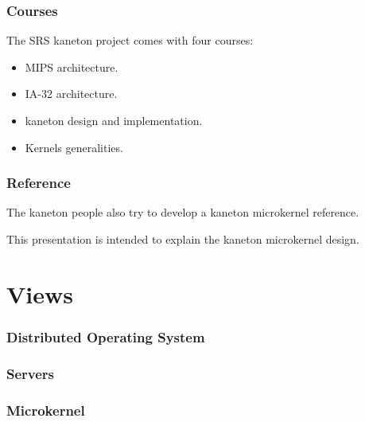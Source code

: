 
\begin{frame}
  \frametitle{Courses}

  The SRS kaneton project comes with four courses:

  \begin{itemize}[<+->]
    \item
      MIPS architecture.
    \item
      IA-32 architecture.
    \item
      kaneton design and implementation.
    \item
      Kernels generalities.
  \end{itemize}
\end{frame}


\begin{frame}
  \frametitle{Reference}

  The kaneton people also try to develop a kaneton microkernel reference.

  \nl

  This presentation is intended to explain the kaneton microkernel
  design.
\end{frame}

%
%

\section{Views}


\begin{frame}
  \frametitle{Distributed Operating System}

  \begin{center}
  \end{center}
\end{frame}


\begin{frame}
  \frametitle{Servers}

  \begin{center}
  \end{center}
\end{frame}


\begin{frame}
  \frametitle{Microkernel}

  \begin{center}
  \end{center}
\end{frame}

